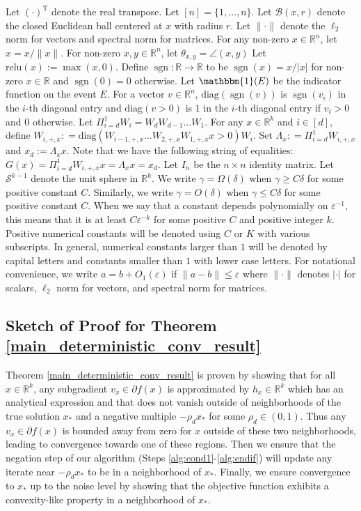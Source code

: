 \documentclass[11pt]{article}
\renewcommand{\epsilon}{\varepsilon}
\newcommand{\R}{\mathbb{R}}
\newcommand{\PiWdix}{\Pi_{i=d}^1 W_{i,+,x}}
\newcommand{\relu}{\text{relu}}
\newcommand{\one}{\operatorname{\mathbbm{1}}}
\newcommand{\sgn}{\operatorname{sgn}}
\newcommand{\G}{G}
\renewcommand{\top}{{\mathrm{T}}}
\theoremstyle{remark}
\begin{document}
Let $ (\cdot)^\top$ denote the real transpose. Let $[n] = \{1,\dots,n\}$. Let $\mathcal{B}(x,r)$ denote the closed Euclidean ball centered at $x$ with radius $r$. Let $\|\cdot\|$ denote the $\ell_2$ norm for vectors and spectral norm for matrices. For any non-zero $x \in \R^n$, let $\hat{x} = x/\|x\|$. For non-zero $x,y \in \R^n$, let $\theta_{x,y} = \angle(x,y)$ Let $\relu(x) := \max(x,0)$. Define $\sgn : \R \rightarrow \R$ to be $\sgn(x) = x/|x|$ for non-zero $x \in \R$ and $\sgn(0) = 0$ otherwise. Let $\one(E)$ be the indicator function on the event $E$. For a vector $v \in \R^n$, $\text{diag}(\sgn(v))$ is $\sgn(v_i)$ in the $i$-th diagonal entry and $\text{diag}(v > 0)$ is $1$ in the $i$-th diagonal entry if $v_i > 0$ and $0$ otherwise. Let $\Pi_{i=d}^1 W_i = W_d W_{d-1} \dots W_1$. For any $x \in \R^k$ and $i \in [d]$, define $W_{i,+,x} : = \text{diag}(W_{i-1,+,x}\dots W_{2,+,x}W_{1,+,x}x > 0)W_i.$ Set $\Lambda_x : = \PiWdix$ and $x_d := \Lambda_x x$. Note that we have the following string of equalities: $\G(x) = \PiWdix x = \Lambda_x x = x_d$. Let $I_n$ be the $n \times n$ identity matrix. Let $\mathcal{S}^{k-1}$ denote the unit sphere in $\R^k$. We write $\gamma = \Omega(\delta)$ when $\gamma \geqslant C\delta$ for some positive constant $C$. Similarly, we write $\gamma = O(\delta)$ when $\gamma \leqslant C \delta$ for some positive constant $C$. When we say that a constant depends polynomially on $\epsilon^{-1}$, this means that it is at least $C \epsilon^{-k}$ for some positive $C$ and positive integer $k$. Positive numerical constants will be denoted using $C$ or $K$ with various subscripts. In general, numerical constants larger than $1$ will be denoted by capital letters and constants smaller than $1$ with lower case letters. For notational convenience, we write $a = b + O_1(\epsilon)$ if $\|a - b\| \leqslant \epsilon$ where $\|\cdot\|$ denotes $|\cdot|$ for scalars, $\ell_2$ norm for vectors, and spectral norm for matrices.



\subsection{Sketch of Proof for Theorem \ref{main_deterministic_conv_result}} \label{det_proof_sketch}


Theorem \ref{main_deterministic_conv_result} is proven by showing that for all $x \in \R^k$, any subgradient $v_x \in \partial f(x)$ is approximated by $h_x \in \R^k$ which has an analytical expression and that does not vanish outside of neighborhoods of the true solution $x_*$ and a negative multiple $-\rho_d x_*$ for some $\rho_d  \in (0,1)$. Thus any $v_x \in \partial f(x)$ is bounded away from zero for $x$ outside of these two neighborhoods, leading to convergence towards one of these regions. Then we ensure that the negation step of our algorithm (Steps \ref{alg:cond1}-\ref{alg:endif}) will update any iterate near $-\rho_d x_*$ to be in a neighborhood of $x_*$. Finally, we ensure convergence to $x_*$ up to the noise level by showing that the objective function exhibits a convexity-like property in a neighborhood of $x_*$.
\end{document}

